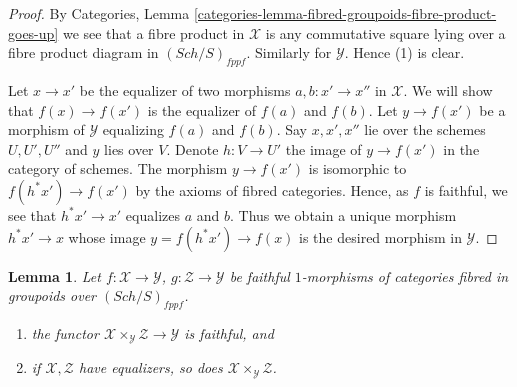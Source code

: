 \documentclass{stacks-project}
\theoremstyle{plain}
\newtheorem{lemma}[subsection]{Lemma}
\theoremstyle{definition}
\theoremstyle{remark}
\numberwithin{equation}{subsection}
\def\Sch{\mathit{Sch}}
\begin{document}
\begin{proof}
By
Categories, Lemma \ref{categories-lemma-fibred-groupoids-fibre-product-goes-up}
we see that a fibre product in $\mathcal{X}$ is any commutative square lying
over a fibre product diagram in $(\Sch/S)_{fppf}$. Similarly for
$\mathcal{Y}$. Hence (1) is clear.

\medskip\noindent
Let $x \to x'$ be the equalizer of two morphisms $a, b : x' \to x''$
in $\mathcal{X}$. We will show that $f(x) \to f(x')$ is the equalizer
of $f(a)$ and $f(b)$. Let $y \to f(x')$ be a morphism of $\mathcal{Y}$
equalizing $f(a)$ and $f(b)$. Say $x, x', x''$ lie over the schemes
$U, U', U''$ and $y$ lies over $V$. Denote $h : V \to U'$ the image
of $y \to f(x')$ in the category of schemes. The morphism
$y \to f(x')$ is isomorphic to $f(h^*x') \to f(x')$ by the axioms of
fibred categories. Hence, as $f$ is faithful, we see that
$h^*x' \to x'$ equalizes $a$ and $b$. Thus we obtain a unique morphism
$h^*x' \to x$ whose image $y = f(h^*x') \to f(x)$ is the desired morphism
in $\mathcal{Y}$.
\end{proof}

\begin{lemma}
\label{lemma-fibre-products-preserve-properties}
Let $f : \mathcal{X} \to \mathcal{Y}$, $g : \mathcal{Z} \to \mathcal{Y}$
be faithful $1$-morphisms of categories
fibred in groupoids over $(\Sch/S)_{fppf}$.
\begin{enumerate}
\item the functor $\mathcal{X} \times_\mathcal{Y} \mathcal{Z} \to \mathcal{Y}$
is faithful, and
\item if $\mathcal{X}, \mathcal{Z}$ have equalizers, so does
$\mathcal{X} \times_\mathcal{Y} \mathcal{Z}$.
\end{enumerate}
\end{lemma}
\end{document}
